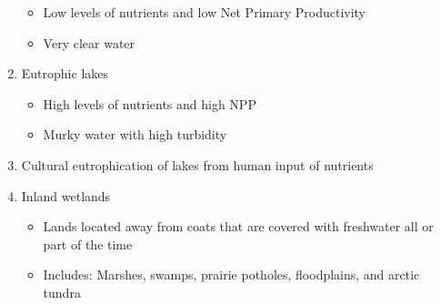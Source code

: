 \documentclass[12pt]{article}
\begin{document}
\begin{enumerate}
    \begin{itemize}

      \item Low levels of nutrients and low Net Primary Productivity

      \item Very clear water

    \end{itemize}

  \item Eutrophic lakes

    \begin{itemize}

      \item High levels of nutrients and high NPP

      \item Murky water with high turbidity

    \end{itemize}

  \item Cultural eutrophication of lakes from human input of nutrients

  \item Inland wetlands

    \begin{itemize}

      \item Lands located away from coats that are covered with freshwater all or part of the time

      \item Includes: Marshes, swamps, prairie potholes, floodplains, and arctic tundra

    \end{itemize}

\end{enumerate}
\end{document}

